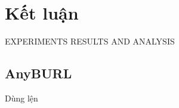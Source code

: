 \chapter{Kết luận}
\label{conclusions}

EXPERIMENTS RESULTS AND ANALYSIS
\section{AnyBURL}

Dùng lện